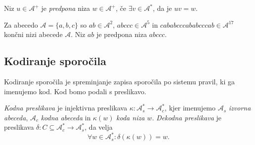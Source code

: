 \documentclass[fin1, tisk]{fmfdelo}
\newcommand{\A}{\mathcal{A}}
\theoremstyle{definition}
\begin{document}
\begin{definicija}
    Niz $u \in \A^+$ je \emph{predpona} niza $w \in \A^+$, če $\exists v \in \A^*$, da je
    $uv = w$.
\end{definicija}

\begin{primer}\label{primer:string}
    Za abecedo $\A = \{ a,b,c \}$ so $\mathit{ab} \in \A^2$, $\mathit{abccc} \in \A^5$
    in $\mathit{cababcccababcccab} \in \A^{17}$ končni nizi abecede $\A$.
    Niz $\mathit{ab}$ je predpona niza $\mathit{abccc}$.
\end{primer}

\subsection{Kodiranje sporočila}

Kodiranje sporočila je spreminjanje zapisa sporočila po sistemu pravil, ki ga imenujemo kod. Kod
bomo podali s preslikavo.

\begin{definicija}
    \emph{Kodna preslikava} je injektivna preslikava $ \kappa \colon \A^*_s
    \to \A_c^* $, kjer imenujemo $\A_s$ \emph{izvorna abeceda}, $\A_c$ 
    \emph{kodna abeceda} in $\kappa(w)$ \emph{koda niza $w$}. 
    \emph{Dekodna preslikava} je preslikava $ \delta \colon C \subseteq \A^*_c 
    \to \A_s^* $, da velja
    \[
        \forall w \in \A_s^* \colon \delta(\kappa(w)) = w.
    \]
\end{definicija}
\end{document}

